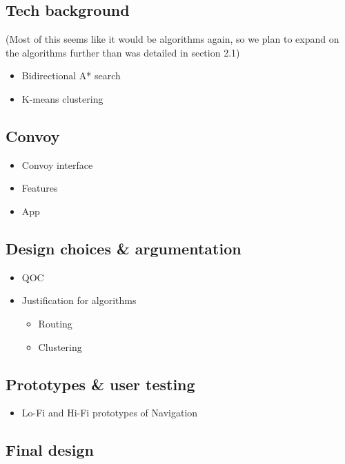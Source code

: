 \documentclass{article}
\begin{document}
\subsection{Tech background} \label{ssec:nav-tech}
(Most of this seems like it would be algorithms again, so we plan to expand on the algorithms further than was detailed in section 2.1)
  \begin{itemize}
    \item Bidirectional A* search
    \item K-means clustering
  \end{itemize}
  
\subsection{Convoy} \label{ssec:nav-convoy}
	\begin{itemize}
    	\item Convoy interface
        \item Features
        \item App
    \end{itemize}
  
\subsection{Design choices \& argumentation} \label{ssec:nav-design}
  \begin{itemize}
    \item QOC
    \item Justification for algorithms
      \begin{itemize}
        \item Routing
        \item Clustering
      \end{itemize}
  \end{itemize}
  
\subsection{Prototypes \& user testing} \label{ssec:nav-prototypes-testing}
\begin{itemize}
	\item Lo-Fi and Hi-Fi prototypes of Navigation
\end{itemize}

\subsection{Final design} \label{ssec:nav-final-design}
\end{document}
